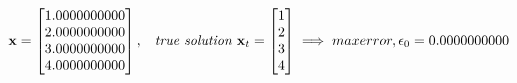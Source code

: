 \documentclass[main]{subfiles}
\begin{document}
    \begin{equation*}
        \textbf{x} = \begin{bmatrix}
            1.0000000000\\
            2.0000000000\\
            3.0000000000\\
            4.0000000000\\
        \end{bmatrix},
        \hspace{3mm}\textit{true solution }\textbf{x}_t = \begin{bmatrix}
            1\\
            2\\
            3\\
            4
        \end{bmatrix}
        \implies max error, \epsilon_0 = 0.0000000000
    \end{equation*}
    \clearpage

\clearpage
\end{document}
